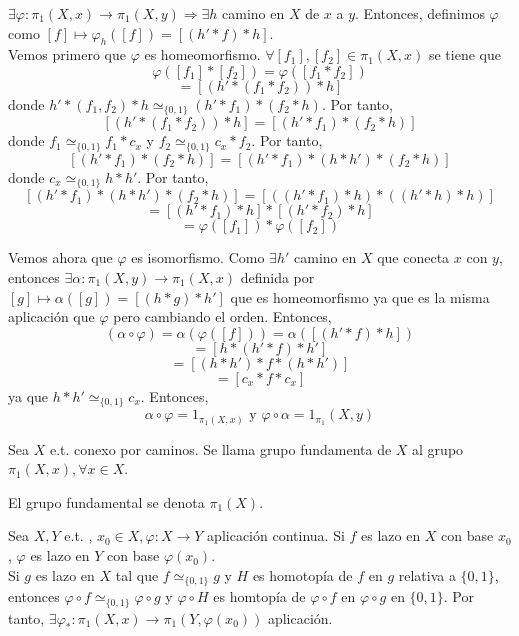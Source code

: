 \begin{dem}
  $\exists \varphi : \pi_{1}(X, x) \to \pi_{1}(X, y) \Rightarrow \exists h$ camino en $X$ de $x$ a $y$. Entonces, definimos $\varphi$ como $[f] \mapsto \varphi_{h}([f]) = [(h' * f) * h]$. \\

  Vemos primero que $\varphi$ es homeomorfismo. $\forall [f_{1}], [f_{2}] \in \pi_{1}(X,x)$ se tiene que 
  \[ 
    \varphi([f_{1}] * [f_{2}]) = \varphi ([f_{1} * f_{2}]) 
  \] 
  \[ 
     = [(h' * (f_{1} * f_{2})) * h ] 
  \] 
  donde $ h' * (f_{1}, f_{2}) * h \simeq_{\{ 0,1 \}} (h' * f_{1}) * (f_{2} * h)$. Por tanto,
  \[ 
    [(h' * (f_{1} * f_{2})) * h ] = [(h' * f_{1}) * (f_{2} * h)]
  \] 
  donde $f_{1} \simeq_{\{ 0, 1\}} f_{1} * c_{x}$ y $f_{2} \simeq_{\{ 0, 1\}} c_{x} * f_{2}$. Por tanto,
  \[ 
    [(h' * f_{1}) * (f_{2} * h)] = [(h' * f_{1}) * (h * h') * (f_{2} * h)]
  \] 
  donde $c_{x} \simeq_{\{ 0, 1 \}} h * h'$. Por tanto,
  \[ 
    [(h' * f_{1}) * (h * h') * (f_{2} * h)] = [((h' * f_{1}) * h) * ((h' * h) * h)]
  \] 
  \[ 
    = [(h' * f_{1}) * h] * [(h' * f_{2}) * h] 
  \] 
  \[ 
    = \varphi([f_{1}]) * \varphi([f_{2}])
  \] 

  Vemos ahora que $\varphi$ es isomorfismo. Como $\exists h'$ camino en $X$ que conecta $x$ con $y$, entonces $\exists \alpha :  \pi_{1}(X, y) \to \pi_{1}(X, x)$ definida por $[g] \mapsto \alpha([g]) = [(h * g) * h']$ que es homeomorfismo ya que es la misma aplicación que $\varphi$ pero cambiando el orden. Entonces,
  \[ 
    (\alpha \circ \varphi) = \alpha(\varphi ([f])) = \alpha([(h' * f) * h ])
  \] 
  \[ 
    = [h * (h' * f) * h'] 
  \] 
  \[ 
    = [(h * h') * f * (h * h')] 
  \] 
  \[ 
    = [c_{x} * f * c_{x}] 
  \] 
  ya que $h * h' \simeq_{\{ 0, 1 \}} c_{x}$. Entonces, 
  \[ 
    \alpha \circ \varphi = 1_{\pi_{1}(X,x)} \text{ y } \varphi \circ \alpha = 1_{\pi_{1}}(X, y)
  \]          
\end{dem}

\begin{defn}
  Sea $X$ e.t. conexo por caminos. Se llama grupo fundamenta de $X$ al grupo $\pi_{1}(X,x), \forall x \in X$.
\end{defn}

\begin{nota}
  El grupo fundamental se denota $\pi_{1}(X)$.
\end{nota}

\begin{obs}
  Sea $X, Y$ e.t. , $x_{0} \in X, \varphi : X \to Y$ aplicación continua. Si $f$ es lazo en $X$ con base $x_{0}$, $\varphi$ es lazo en $Y$ con base $\varphi(x_{0})$. \\

  Si $g$ es lazo en $X$ tal que $f \simeq_{\{ 0, 1 \}} g$ y $H$ es homotopía de $f$ en $g$ relativa a $\{ 0, 1 \}$, entonces $\varphi \circ f \simeq_{\{ 0, 1 \}} \varphi \circ g$ y $\varphi \circ H$ es homtopía de $\varphi  \circ f$ en $\varphi \circ g$ en $\{ 0, 1 \}$. Por tanto, $\exists \varphi_{*} : \pi_{1}(X, x) \to \pi_{1}(Y, \varphi(x_{0}))$ aplicación.
\end{obs} 

